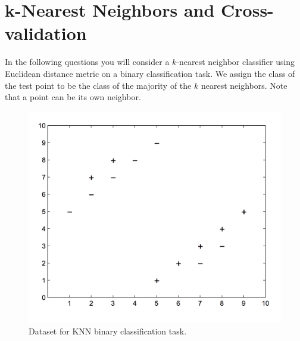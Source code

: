 \documentclass[11pt]{article}
\begin{document}
\clearpage
\section{k-Nearest Neighbors and Cross-validation }
In the following questions you will consider a $k$-nearest neighbor classifier using Euclidean
distance metric on a binary classification task. 
We assign the class of the test point to be the
class of the majority of the $k$ nearest neighbors. 
Note that a point can be its own neighbor.
\begin{figure}[h]
\centering
\includegraphics[scale=0.45]{knn_figure.png}
\caption{Dataset for KNN binary classification task.}
\label{fig:knn}
\end{figure}
\end{document}
